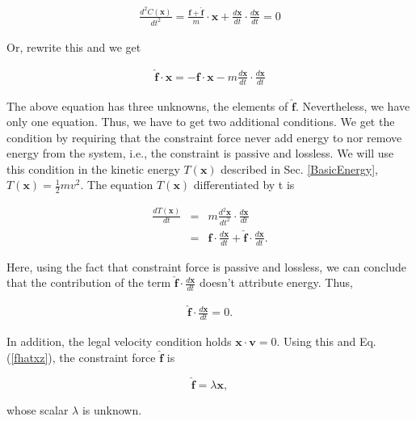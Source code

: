 \documentclass[pdflatex,sn-mathphys-num]{sn-jnl}%
\theoremstyle{thmstyleone}%
\theoremstyle{thmstyletwo}%
\theoremstyle{thmstylethree}%
\begin{document}
\begin{eqnarray}
	\frac{d^2 C(\boldsymbol{x})}{dt^2} = \frac{\boldsymbol{f}+\boldsymbol{\hat{f}}}{m}\cdot \boldsymbol{x} + \frac{d\boldsymbol{x}}{dt}\cdot\frac{d\boldsymbol{x}}{dt} = 0
\end{eqnarray}
 
Or, rewrite this and we get

\begin{eqnarray}
	\boldsymbol{\hat{f}} \cdot \boldsymbol{x} = -\boldsymbol{f}\cdot\boldsymbol{x} - m \frac{d\boldsymbol{x}}{dt}\cdot\frac{d\boldsymbol{x}}{dt}\label{fhatxeqmf}
\end{eqnarray}

The above equation has three unknowns, the elements of $\boldsymbol{\hat{f}}$. Nevertheless, we have only one equation. Thus, we have to get two additional conditions. We get the condition by requiring that the constraint force never add energy to nor remove energy from the system, i.e., the constraint is passive and lossless. We will use this condition in the kinetic energy $T(\boldsymbol{x})$ described in Sec. \ref{BasicEnergy},  $T(\boldsymbol{x}) = \frac{1}{2}m v^2$. The equation $T(\boldsymbol{x})$ differentiated by t is

\begin{eqnarray}
	\frac{dT(\boldsymbol{x})}{dt} &=& m\frac{d^2\boldsymbol{x}}{dt^2}\cdot \frac{d\boldsymbol{x}}{dt}\nonumber\\
	&=& \boldsymbol{f} \cdot \frac{d\boldsymbol{x}}{dt}+ \boldsymbol{\hat{f}}\cdot \frac{d\boldsymbol{x}}{dt}.
\end{eqnarray}

Here, using the fact that constraint force is passive and lossless, we can conclude that the contribution of the term $\boldsymbol{\hat{f}}\cdot \frac{d\boldsymbol{x}}{dt}$ doesn't attribute energy. Thus,

\begin{eqnarray}
	\boldsymbol{\hat{f}}\cdot \frac{d\boldsymbol{x}}{dt} = 0.\label{fhatxz}
\end{eqnarray}

In addition, the legal velocity condition holds $\boldsymbol{x} \cdot  \boldsymbol{v} = 0$. Using this and Eq. (\ref{fhatxz}), the constraint force $\boldsymbol{\hat{f}}$ is

\begin{equation}
	\boldsymbol{\hat{f}} = \lambda\boldsymbol{x},
\end{equation}

whose scalar $\lambda$ is unknown.
\end{document}
